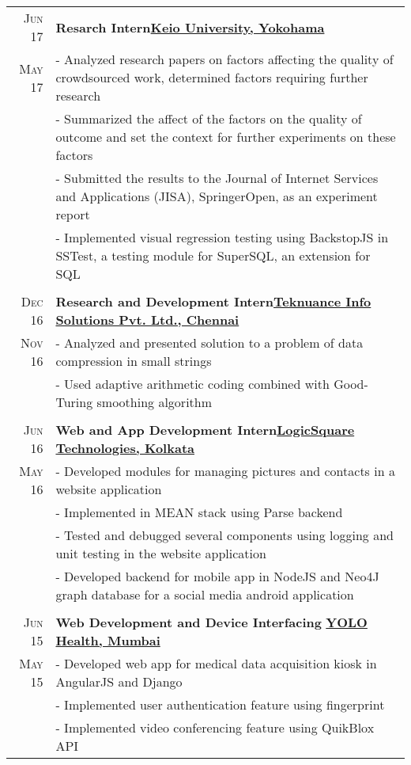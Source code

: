 \documentclass[a4paper,11pt]{extarticle} %
\begin{document}
\begin{tabular}{r|p{18cm}}

\textsc{Jun 17} & \textbf{Resarch Intern}\hfill\textbf{\href{https://www.keio.ac.jp/en/}{Keio University, Yokohama}}\\
\textsc{May 17}& \footnotesize{- Analyzed research papers on factors affecting the quality of crowdsourced work, determined factors requiring further research}\\
& \footnotesize{- Summarized the affect of the factors on the quality of outcome and set the context for further experiments on these factors}\\
& \footnotesize{- Submitted the results to the Journal of Internet Services and Applications (JISA), SpringerOpen, as an experiment report}\\
& \footnotesize{- Implemented visual regression testing using BackstopJS in SSTest, a testing module for SuperSQL, an extension for SQL}\\
\multicolumn{2}{c}{} \\

\textsc{Dec 16} & \textbf{Research and Development Intern}\hfill\textbf{\href{http://www.teknuance.com/}{Teknuance Info Solutions Pvt. Ltd., Chennai}}\\
\textsc{Nov 16} & \footnotesize{- Analyzed and presented solution to a problem of data compression in small strings}\\
& \footnotesize{- Used adaptive arithmetic coding combined with Good-Turing smoothing algorithm}\\
\multicolumn{2}{c}{}\\

\textsc{Jun 16} & \textbf{Web and App Development Intern}\hfill\textbf{\href{http://www.logic-square.com/}{LogicSquare Technologies, Kolkata}}\\
\textsc{May 16}& \footnotesize{- Developed modules for managing pictures and contacts in a website application}\\
& \footnotesize{- Implemented in MEAN stack using Parse backend}\\
& \footnotesize{- Tested and debugged several components using logging and unit testing in the website application}\\
& \footnotesize{- Developed backend for mobile app in NodeJS and Neo4J graph database for a social media android application}\\
\multicolumn{2}{c}{} \\

\textsc{Jun 15} & \textbf{Web Development and Device Interfacing} \hfill\textbf{\href{https://yolohealth.in/}{YOLO Health, Mumbai}}\\
\textsc{May 15} & \footnotesize{- Developed web app for medical data acquisition kiosk in AngularJS and Django}\\
& \footnotesize{- Implemented user authentication feature using fingerprint}\\
& \footnotesize{- Implemented video conferencing feature using QuikBlox API}\\
\end{tabular}
\end{document}
